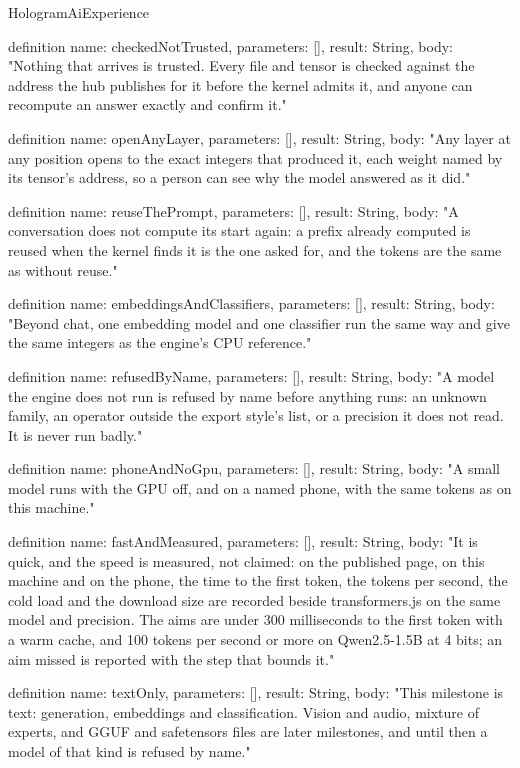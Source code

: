 \begin{lexlean}{HologramAiExperience}
\begin{semanticmodule}
definition{
  name: checkedNotTrusted,
  parameters: [],
  result: String,
  body: "Nothing that arrives is trusted. Every file and tensor is checked against the address the hub publishes for it before the kernel admits it, and anyone can recompute an answer exactly and confirm it."
}

definition{
  name: openAnyLayer,
  parameters: [],
  result: String,
  body: "Any layer at any position opens to the exact integers that produced it, each weight named by its tensor's address, so a person can see why the model answered as it did."
}

definition{
  name: reuseThePrompt,
  parameters: [],
  result: String,
  body: "A conversation does not compute its start again: a prefix already computed is reused when the kernel finds it is the one asked for, and the tokens are the same as without reuse."
}

definition{
  name: embeddingsAndClassifiers,
  parameters: [],
  result: String,
  body: "Beyond chat, one embedding model and one classifier run the same way and give the same integers as the engine's CPU reference."
}

definition{
  name: refusedByName,
  parameters: [],
  result: String,
  body: "A model the engine does not run is refused by name before anything runs: an unknown family, an operator outside the export style's list, or a precision it does not read. It is never run badly."
}

definition{
  name: phoneAndNoGpu,
  parameters: [],
  result: String,
  body: "A small model runs with the GPU off, and on a named phone, with the same tokens as on this machine."
}

definition{
  name: fastAndMeasured,
  parameters: [],
  result: String,
  body: "It is quick, and the speed is measured, not claimed: on the published page, on this machine and on the phone, the time to the first token, the tokens per second, the cold load and the download size are recorded beside transformers.js on the same model and precision. The aims are under 300 milliseconds to the first token with a warm cache, and 100 tokens per second or more on Qwen2.5-1.5B at 4 bits; an aim missed is reported with the step that bounds it."
}

definition{
  name: textOnly,
  parameters: [],
  result: String,
  body: "This milestone is text: generation, embeddings and classification. Vision and audio, mixture of experts, and GGUF and safetensors files are later milestones, and until then a model of that kind is refused by name."
}
\end{semanticmodule}
\end{lexlean}
